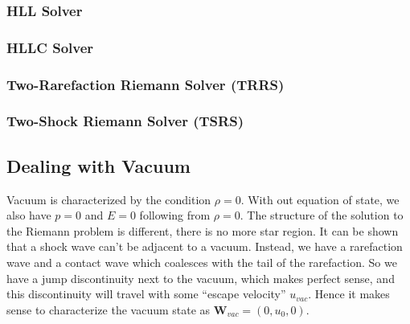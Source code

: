 \subsubsection{HLL Solver}


\subsubsection{HLLC Solver}


\subsubsection{Two-Rarefaction Riemann Solver (TRRS)}


\subsubsection{Two-Shock Riemann Solver (TSRS)}














\subsection{Dealing with Vacuum}


Vacuum is characterized by the condition $\rho = 0$.
With out equation of state, we also have $p = 0$ and $E = 0$ following from $\rho = 0$.
The structure of the solution to the Riemann problem is different, there is no more star region.
It can be shown that a shock wave can't be adjacent to a vacuum.
Instead, we have a rarefaction wave and a contact wave which coalesces with the tail of the rarefaction.
So we have a jump discontinuity next to the vacuum, which makes perfect sense, and this discontinuity will travel with some ``escape velocity'' $u_{vac}$.
Hence it makes sense to characterize the vacuum state as $\mathbf{W}_{vac} = (0, u_0, 0)$.

